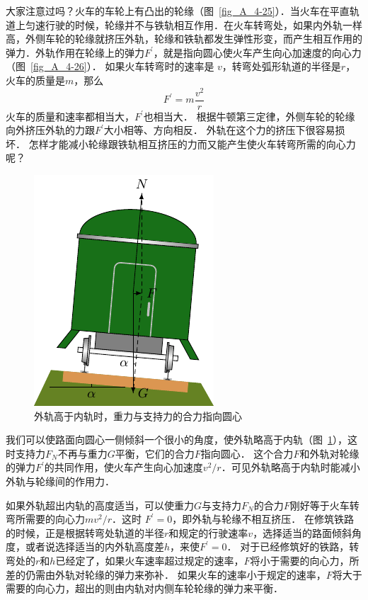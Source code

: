 大家注意过吗？火车的车轮上有凸出的轮缘（图~\ref{fig_A_4-25}）．当火车在平直轨道上匀速行驶的时候，轮缘并不与铁轨相互作用．在火车转弯处，如果内外轨一样高，外侧车轮的轮缘就挤压外轨，轮缘和铁轨都发生弹性形变，而产生相互作用的弹力．外轨作用在轮缘上的弹力$F^{\prime}$，就是指向圆心使火车产生向心加速度的向心力（图~\ref{fig_A_4-26}）．
如果火车转弯时的速率是
$v$，转弯处弧形轨道的半径是$r$，火车的质量是$m$，那么
\[F^{\prime}=m\frac{v^2}{r} \]
火车的质量和速率都相当大，$F^{\prime}$也相当大．
根据牛顿第三定律，外侧车轮的轮缘向外挤压外轨的力跟$F^{\prime}$大小相等、方向相反．
外轨在这个力的挤压下很容易损坏．
怎样才能减小轮缘跟铁轨相互挤压的力而又能产生使火车转弯所需的向心力呢？
\begin{figure}[htbp]
    \centering
    \includegraphics{fig/A/4-27.pdf}
    \caption{外轨高于内轨时，重力与支持力的合力指向圆心}\label{fig_A_4-27}
\end{figure}

我们可以使路面向圆心一侧倾斜一个很小的角度，使外轨略高于内轨（图~\ref{fig_A_4-27}），这时支持力$F_N$不再与重力$G$平衡，它们的合力$F$指向圆心．
这个合力$F$和外轨对轮缘的弹力$F^{\prime}$的共同作用，使火车产生向心加速度$v^2/r$．可见外轨略高于内轨时能减小外轨与轮缘间的作用力．


如果外轨超出内轨的高度适当，可以使重力$G$与支持力$F_N$的合力$F$刚好等于火车转弯所需要的向心力$mv^2/r$．这时
$F^{\prime}=0$，即外轨与轮缘不相互挤压．
在修筑铁路的时候，正是根据转弯处轨道的半径$r$和规定的行驶速率$v$，选择适当的路面倾斜角度，或者说选择适当的内外轨高度差$h$，来使$F^{\prime}=0$．
对于已经修筑好的铁路，转弯处的$r$和$h$已经定了，如果火车速率超过规定的速率，$F$将小于需要的向心力，所差的仍需由外轨对轮缘的弹力来弥补．
如果火车的速率小于规定的速率，$F$将大于需要的向心力，超出的则由内轨对内侧车轮轮缘的弹力来平衡．

